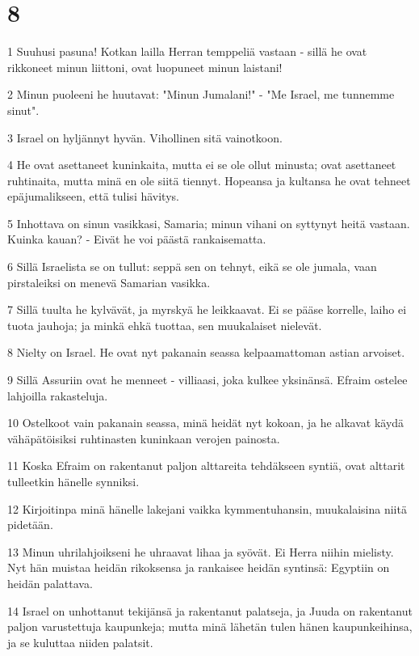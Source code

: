 \chapter{8}

\par 1 Suuhusi pasuna! Kotkan lailla Herran temppeliä vastaan - sillä he ovat rikkoneet minun liittoni, ovat luopuneet minun laistani!
\par 2 Minun puoleeni he huutavat: "Minun Jumalani!" - "Me Israel, me tunnemme sinut".
\par 3 Israel on hyljännyt hyvän. Vihollinen sitä vainotkoon.
\par 4 He ovat asettaneet kuninkaita, mutta ei se ole ollut minusta; ovat asettaneet ruhtinaita, mutta minä en ole siitä tiennyt. Hopeansa ja kultansa he ovat tehneet epäjumalikseen, että tulisi hävitys.
\par 5 Inhottava on sinun vasikkasi, Samaria; minun vihani on syttynyt heitä vastaan. Kuinka kauan? - Eivät he voi päästä rankaisematta.
\par 6 Sillä Israelista se on tullut: seppä sen on tehnyt, eikä se ole jumala, vaan pirstaleiksi on menevä Samarian vasikka.
\par 7 Sillä tuulta he kylvävät, ja myrskyä he leikkaavat. Ei se pääse korrelle, laiho ei tuota jauhoja; ja minkä ehkä tuottaa, sen muukalaiset nielevät.
\par 8 Nielty on Israel. He ovat nyt pakanain seassa kelpaamattoman astian arvoiset.
\par 9 Sillä Assuriin ovat he menneet - villiaasi, joka kulkee yksinänsä. Efraim ostelee lahjoilla rakasteluja.
\par 10 Ostelkoot vain pakanain seassa, minä heidät nyt kokoan, ja he alkavat käydä vähäpätöisiksi ruhtinasten kuninkaan verojen painosta.
\par 11 Koska Efraim on rakentanut paljon alttareita tehdäkseen syntiä, ovat alttarit tulleetkin hänelle synniksi.
\par 12 Kirjoitinpa minä hänelle lakejani vaikka kymmentuhansin, muukalaisina niitä pidetään.
\par 13 Minun uhrilahjoikseni he uhraavat lihaa ja syövät. Ei Herra niihin mielisty. Nyt hän muistaa heidän rikoksensa ja rankaisee heidän syntinsä: Egyptiin on heidän palattava.
\par 14 Israel on unhottanut tekijänsä ja rakentanut palatseja, ja Juuda on rakentanut paljon varustettuja kaupunkeja; mutta minä lähetän tulen hänen kaupunkeihinsa, ja se kuluttaa niiden palatsit.

